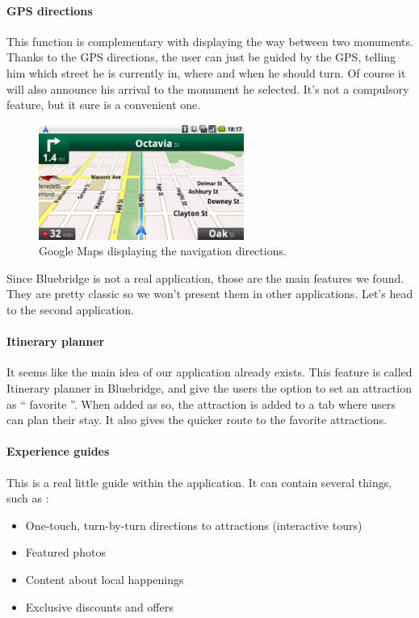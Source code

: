 \paragraph{GPS directions} This function is complementary with displaying the way between two monuments. Thanks to the GPS directions, the user can just be guided by the GPS, telling him which street he is currently in, where and when he should turn. Of course it will also announce his arrival to the monument he selected. It's not a compulsory feature, but it sure is a convenient one.
\begin{figure}[h!]
	\centering
	\includegraphics[width=0.6\textwidth]{input/directions.png}
	\caption{Google Maps displaying the navigation directions.}
	\label{fig:directions}
\end{figure}
Since Bluebridge is not a real application, those are the main features we found. They are pretty classic so we won't present them in other applications. Let's head to the second application.

\paragraph{Itinerary planner} It seems like the main idea of our application already exists. This feature is called Itinerary planner in Bluebridge, and give the users the option to set an attraction as `` favorite ''. When added as so, the attraction is added to a tab where users can plan their stay. It also gives the quicker route to the favorite attractions.


\paragraph{Experience guides} This is a real little guide within the application. It can contain several things, such as :
\begin{itemize}
	\item One-touch, turn-by-turn directions to attractions (interactive tours)
  \item Featured photos
  \item Content about local happenings
  \item Exclusive discounts and offers
\end{itemize}

